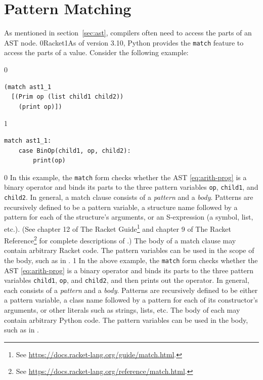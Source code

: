 \documentclass[7x10]{TimesAPriori_MIT}%
\def\racketEd{0}
\def\pythonEd{1}
\def\edition{0}
\newcommand{\racket}[1]{{\if\edition\racketEd{#1}\fi}}
\newcommand{\python}[1]{{\if\edition\pythonEd #1\fi}}
\numberwithin{theorem}{chapter}
\numberwithin{definition}{chapter}
\numberwithin{equation}{chapter}
\begin{document}
\section{Pattern Matching}
\label{sec:pattern-matching}

As mentioned in section~\ref{sec:ast}, compilers often need to access
the parts of an AST node. \racket{Racket}\python{As of version 3.10, Python}
provides the \texttt{match} feature to access the parts of a value.
Consider the following example:  
\begin{center}
\begin{minipage}{0.5\textwidth}
{\if\edition\racketEd
\begin{lstlisting}
(match ast1_1
  [(Prim op (list child1 child2))
    (print op)])
\end{lstlisting}
\fi}
{\if\edition\pythonEd
\begin{lstlisting}
match ast1_1:
    case BinOp(child1, op, child2):
        print(op)
\end{lstlisting}
\fi}  
\end{minipage}
\end{center}

{\if\edition\racketEd
%
In this example, the \texttt{match} form checks whether the AST
\eqref{eq:arith-prog} is a binary operator and binds its parts to the
three pattern variables \texttt{op}, \texttt{child1}, and
\texttt{child2}. In general, a match clause consists of a
\emph{pattern} and a \emph{body}. Patterns are
recursively defined to be a pattern variable, a structure name
followed by a pattern for each of the structure's arguments, or an
S-expression (a symbol, list, etc.).  (See chapter 12 of The Racket
Guide\footnote{See \url{https://docs.racket-lang.org/guide/match.html}.}
and chapter 9 of The Racket
Reference\footnote{See \url{https://docs.racket-lang.org/reference/match.html}.}
for complete descriptions of .)
%
The body of a match clause may contain arbitrary Racket code.  The
pattern variables can be used in the scope of the body, such as
 in .
%
\fi}
%
%
{\if\edition\pythonEd
%  
In the above example, the \texttt{match} form checks whether the AST
\eqref{eq:arith-prog} is a binary operator and binds its parts to the
three pattern variables \texttt{child1}, \texttt{op}, and
\texttt{child2}, and then prints out the operator. In general, each
 consists of a \emph{pattern} and a
\emph{body}. Patterns are recursively defined
to be either a pattern variable, a class name followed by a pattern
for each of its constructor's arguments, or other literals such as
strings, lists, etc.
%
The body of each  may contain arbitrary Python code. The
pattern variables can be used in the body, such as  in
.
%
\fi}
\end{document}
